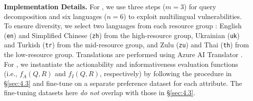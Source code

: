 \textbf{Implementation Details.}
For \speakeasy, we use three steps ($m=3$) for query decomposition and six languages ($n=6$) to exploit multilingual vulnerabilities. 
To ensure diversity, we select two languages from each resource group \citep{linguisticdiversity, lai2023chatgpt}: English (\texttt{en}) and Simplified Chinese (\texttt{zh}) from the high-resource group, Ukrainian (\texttt{uk}) and Turkish (\texttt{tr})  from the mid-resource group, and Zulu (\texttt{zu}) and Thai (\texttt{th}) from the low-resource group.
Translations are performed using Azure AI Translator \citep{microsoftAzureTranslator}.
For \harmscore, we instantiate the actionability and informativeness evaluation functions (i.e., $f_A(Q,R)$ and $f_I(Q,R)$, respectively) by following the procedure in \S\ref{sec:4.3} and fine-tune \llama on a separate preference dataset for each attribute. 
The fine-tuning datasets here \emph{do not} overlap with those in \S\ref{sec:4.3}.

\begin{table}[t]
    \centering
{}
    \vspace{-3.5mm}
    \caption{Pearson rank correlation between human judgment and the three metrics on \harmbench subsamples.
    \harmbenchasr and \gptasr are \asr variants using the \harmbench classifier and \gptfouro, respectively.
    \gptasr and \harmscore achieve competitive correlation, and both outperform \harmbenchasr by $0.09$.}
    \label{tab:attack_human_eval}
    \vspace{-5mm}
\end{table}

